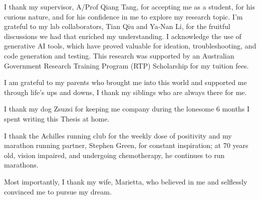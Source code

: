I thank my supervisor, A/Prof Qiang Tang, for accepting me as a student, for his curious nature, and for his confidence in me to explore my research topic. I'm grateful to my lab collaborators, Tian Qiu and Ya-Nan Li, for the fruitful discussions we had that enriched my understanding. I acknowledge the use of generative AI tools, which have proved valuable for ideation, troubleshooting, and code generation and testing. This research was supported by an Australian Government Research Training Program (RTP) Scholarship for my tuition fees.

I am grateful to my parents who brought me into this world and supported me through life's ups and downs, I thank my siblings who are always there for me. 

I thank my dog Zsuzsi for keeping me company during the lonesome 6 months I spent writing this Thesis at home.

I thank the Achilles running club for the weekly dose of positivity and my marathon running partner, Stephen Green, for constant inspiration; at 70 years old, vision impaired, and undergoing chemotherapy, he continues to run marathons. 

Most importantly, I thank my wife, Marietta, who believed in me and selflessly convinced me to pursue my dream.
